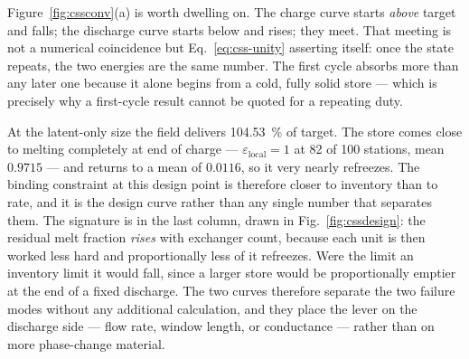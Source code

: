 Figure~\ref{fig:cssconv}(a) is worth dwelling on. The charge curve starts
\emph{above} target and falls; the discharge curve starts below and rises; they
meet. That meeting is not a numerical coincidence but
Eq.~\eqref{eq:css-unity} asserting itself: once the state repeats, the two
energies are the same number. The first cycle absorbs more than any later one
because it alone begins from a cold, fully solid store --- which is precisely
why a first-cycle result cannot be quoted for a repeating duty.

At the latent-only size the field delivers \SI{104.53}{\percent} of target. The
store comes close to melting completely at end of charge ---
$\varepsilon_{\mathrm{local}}=1$ at \num{82} of \num{100} stations, mean
$0.9715$ --- and returns to a mean of $0.0116$, so it very nearly refreezes. The
binding constraint at this design point is therefore closer to inventory than to
rate, and it is the design curve rather than any single number that separates
them. The
signature is in the last column, drawn in Fig.~\ref{fig:cssdesign}: the residual
melt fraction \emph{rises} with exchanger count, because each unit is then
worked less hard and proportionally less of it refreezes. Were the limit an
inventory limit it would fall, since a larger store would be proportionally
emptier at the end of a fixed discharge. The two curves therefore separate the
two failure modes without any additional calculation, and they place the lever
on the discharge side --- flow rate, window length, or conductance --- rather
than on more phase-change material.
